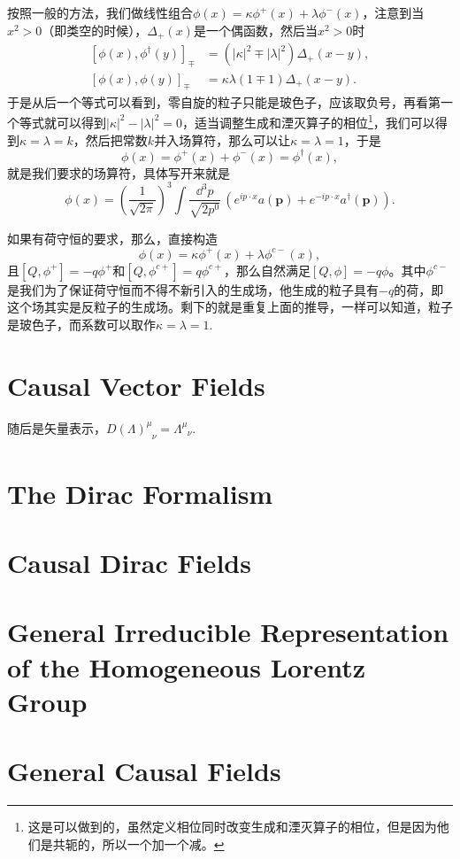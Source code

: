 \documentclass[9pt]{extbook}
\theoremstyle{plain}%
\begin{document}
按照一般的方法，我们做线性组合$\phi(x)=\kappa\phi^+(x)+\lambda\phi^-(x)$，注意到当$x^2>0$（即类空的时候），$\Delta_+(x)$是一个偶函数，然后当$x^2>0$时
\[
\begin{split}
	[\phi(x),\phi^\dag(y)]_{\mp}&=(|\kappa|^2\mp |\lambda|^2)\Delta_+(x-y),\\
	[\phi(x),\phi(y)]_{\mp}&=\kappa\lambda(1\mp 1)\Delta_+(x-y).
\end{split}	
\]
于是从后一个等式可以看到，零自旋的粒子只能是玻色子，应该取负号，再看第一个等式就可以得到$|\kappa|^2-|\lambda|^2=0$，适当调整生成和湮灭算子的相位\footnote{这是可以做到的，虽然定义相位同时改变生成和湮灭算子的相位，但是因为他们是共轭的，所以一个加一个减。}，我们可以得到$\kappa=\lambda=k$，然后把常数$k$并入场算符，那么可以让$\kappa=\lambda=1$，于是
\[
	\phi(x)=\phi^+(x)+\phi^-(x)=\phi^\dag(x),
\]
就是我们要求的场算符，具体写开来就是
\[
	\phi(x)=\left(\frac{1}{\sqrt{2\pi}}\right)^{3}\int \frac{\dd^3 p}{\sqrt{2p^0}}\, (e^{ip\cdot x}a(\mathbf{p})+e^{-ip\cdot x}a^\dag(\mathbf{p})).
\]

如果有荷守恒的要求，那么，直接构造
\[
	\phi(x)=\kappa\phi^+(x)+\lambda\phi^{c-}(x),
\]
且$[Q,\phi^+]=-q\phi^+$和$[Q,\phi^{c+}]=q\phi^{c+}$，那么自然满足$[Q,\phi]=-q\phi$。其中$\phi^{c-}$是我们为了保证荷守恒而不得不新引入的生成场，他生成的粒子具有$-q$的荷，即这个场其实是反粒子的生成场。剩下的就是重复上面的推导，一样可以知道，粒子是玻色子，而系数可以取作$\kappa=\lambda=1$.
\section{Causal Vector Fields}
随后是矢量表示，$D(\Lambda)^\mu_{\phantom{\mu}\nu}=\Lambda^\mu_{\phantom{\mu}\nu}$.
\section{The Dirac Formalism}

\section{Causal Dirac Fields}

\section{General Irreducible Representation of the Homogeneous Lorentz Group}

\section{General Causal Fields}
\end{document}
